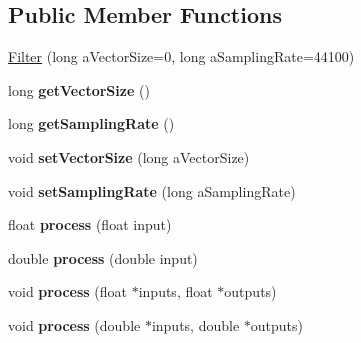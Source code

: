\subsection*{Public Member Functions}
\begin{DoxyCompactItemize}
\item 
\hyperlink{class_filter_a5c6deec2210aaa2664d512ec35a5dfc0}{Filter} (long a\-Vector\-Size=0, long a\-Sampling\-Rate=44100)
\item 
\hypertarget{class_filter_aa8f928748937e51095a22ce29c9c08c4}{long {\bfseries get\-Vector\-Size} ()}\label{class_filter_aa8f928748937e51095a22ce29c9c08c4}

\item 
\hypertarget{class_filter_aceb44fa5badb70e5f35fd7388288650b}{long {\bfseries get\-Sampling\-Rate} ()}\label{class_filter_aceb44fa5badb70e5f35fd7388288650b}

\item 
\hypertarget{class_filter_a8ee16a822086b1a96ac6b625c77d923d}{void {\bfseries set\-Vector\-Size} (long a\-Vector\-Size)}\label{class_filter_a8ee16a822086b1a96ac6b625c77d923d}

\item 
\hypertarget{class_filter_a02c21fa49f5a8837a1ece9db10722493}{void {\bfseries set\-Sampling\-Rate} (long a\-Sampling\-Rate)}\label{class_filter_a02c21fa49f5a8837a1ece9db10722493}

\item 
\hypertarget{class_filter_ac7f8d9d379dcc40e98d4204eac023f22}{float {\bfseries process} (float input)}\label{class_filter_ac7f8d9d379dcc40e98d4204eac023f22}

\item 
\hypertarget{class_filter_a2379f87a7f71d76069abfcc090aaa24c}{double {\bfseries process} (double input)}\label{class_filter_a2379f87a7f71d76069abfcc090aaa24c}

\item 
\hypertarget{class_filter_a250100634bd88b32db92b248cc49d2d7}{void {\bfseries process} (float $\ast$inputs, float $\ast$outputs)}\label{class_filter_a250100634bd88b32db92b248cc49d2d7}

\item 
\hypertarget{class_filter_ab5c77fb6f129588d6b1fedb51de1b12e}{void {\bfseries process} (double $\ast$inputs, double $\ast$outputs)}\label{class_filter_ab5c77fb6f129588d6b1fedb51de1b12e}

\end{DoxyCompactItemize}
